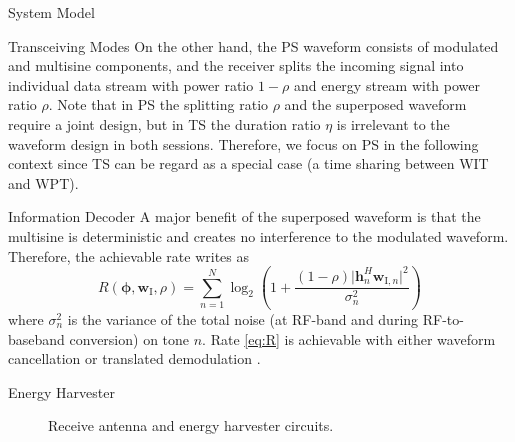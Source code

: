 \documentclass[journal]{IEEEtran}
\begin{document}
\begin{section}{System Model}
\begin{subsection}{Transceiving Modes}
			On the other hand, the PS waveform consists of modulated and multisine components, and the receiver splits the incoming signal into individual data stream with power ratio $1 - \rho$ and energy stream with power ratio $\rho$. Note that in PS the splitting ratio $\rho$ and the superposed waveform require a joint design, but in TS the duration ratio $\eta$ is irrelevant to the waveform design in both sessions. Therefore, we focus on PS in the following context since TS can be regard as a special case (a time sharing between WIT and WPT).
		\end{subsection}


		\begin{subsection}{Information Decoder}
			A major benefit of the superposed waveform is that the multisine is deterministic and creates no interference to the modulated waveform. Therefore, the achievable rate writes as
			\begin{equation}\label{eq:R}
				R(\boldsymbol{\phi},\boldsymbol{w}_{\mathrm{I}},\rho) = \sum_{n=1}^N{\log_2\left(1+\frac{(1-\rho)\lvert \boldsymbol{h}_{n}^H\boldsymbol{w}_{\mathrm{I},n} \rvert^2}{\sigma_n^2}\right)}
			\end{equation}
			where $\sigma_n^2$ is the variance of the total noise (at RF-band and during RF-to-baseband conversion) on tone $n$. Rate \eqref{eq:R} is achievable with either waveform cancellation or translated demodulation \cite{Clerckx2018b}.
		\end{subsection}


		\begin{subsection}{Energy Harvester}
			\begin{figure}[!t]
				\centering
				\caption{Receive antenna and energy harvester circuits.}
			\end{figure}


\end{subsection}
\end{section}
\end{document}
